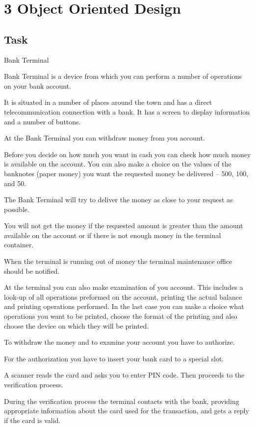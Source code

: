 \documentclass[11pt]{article}
\begin{document}
\section{3 Object Oriented Design}
\label{sec:orgheadline18}
\subsection{Task}
\label{sec:orgheadline7}
Bank Terminal

Bank Terminal is a device from which you can perform a number of operations on your bank
account.

It is situated in a number of places around the town and has a direct telecommunication
connection with a bank. It has a screen to display information and a number of buttons.

At the Bank Terminal you can withdraw money from you account.

Before you decide on how much you want in cash you can check how much money is
available on the account. You can also make a choice on the values of the banknotes (paper
money) you want the requested money be delivered – 500, 100, and 50.

The Bank Terminal will try to deliver the money as close to your request as possible.

You will not get the money if the requested amount is greater than the amount available on
the account or if there is not enough money in the terminal container.

When the terminal is running out of money the terminal maintenance office should be notified.

At the terminal you can also make examination of you account. This includes a look-up of all
operations preformed on the account, printing the actual balance and printing operations
performed. In the last case you can make a choice what operations you want to be printed,
choose the format of the printing and also choose the device on which they will be printed.

To withdraw the money and to examine your account you have to authorize.

For the authorization you have to insert your bank card to a special slot.

A scanner reads the card and asks you to enter PIN code. Then proceeds to the verification
process.

During the verification process the terminal contacts with the bank, providing appropriate
information about the card used for the transaction, and gets a reply if the card is valid.
\end{document}
